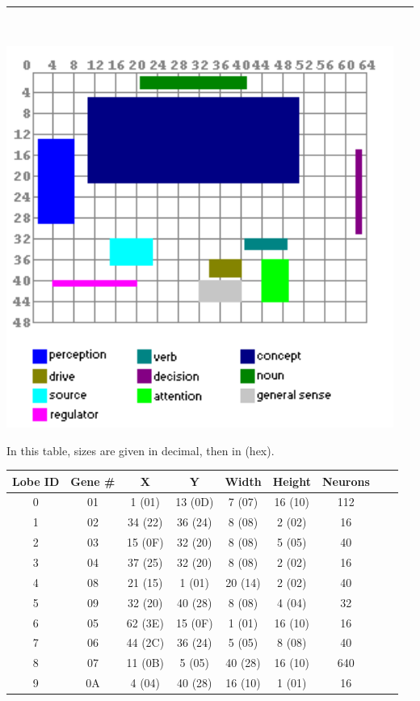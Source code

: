 \documentclass[11pt,twoside,a4paper]{article}
\begin{document}
\hrule ~\\

\begin{minipage}[ht]{0.40\textwidth}
	\includegraphics[width=0.95\textwidth]{img/brainmap2.png}
\end{minipage} \hfill \begin{minipage}[ht]{0.675\textwidth}
	\small
	In this table, sizes are given in decimal, then in (hex). ~\\
	\begin{tabular}[h]{|c|c|c|c|c|c|c|c|c|}
		\hline
		Lobe ID	&	Gene \#	&	X		&	Y		&	Width	&	Height	&	Neurons	\\ \hline
		0		&	01		&	1 (01)	&	13 (0D)	&	7 (07)	&	16 (10)	&	112		\\ \hline
		1		&	02		&	34 (22)	&	36 (24)	&	8 (08)	&	2 (02)	&	16		\\ \hline
		2		&	03		&	15 (0F)	&	32 (20)	&	8 (08)	&	5 (05)	&	40		\\ \hline
		3		&	04		&	37 (25)	&	32 (20)	&	8 (08)	&	2 (02)	&	16		\\ \hline
		4		&	08		&	21 (15)	&	1 (01)	&	20 (14)	&	2 (02)	&	40		\\ \hline
		5		&	09		&	32 (20)	&	40 (28)	&	8 (08)	&	4 (04)	&	32		\\ \hline
		6		&	05		&	62 (3E)	&	15 (0F)	&	1 (01)	&	16 (10)	&	16		\\ \hline
		7		&	06		&	44 (2C)	&	36 (24)	&	5 (05)	&	8 (08)	&	40		\\ \hline
		8		&	07		&	11 (0B)	&	5 (05)	&	40 (28)	&	16 (10)	&	640		\\ \hline
		9		&	0A		&	4 (04)	&	40 (28)	&	16 (10)	&	1 (01)	&	16		\\ \hline
	\end{tabular}
\end{minipage} ~\\
\end{document}
